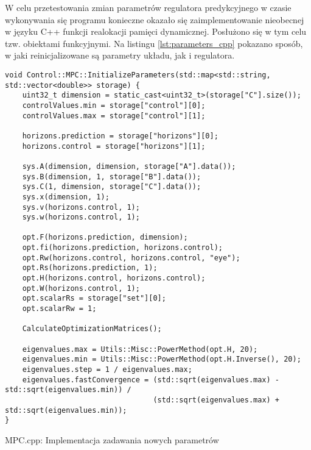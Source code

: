 W celu przetestowania zmian parametrów regulatora predykcyjnego w czasie wykonywania się programu
konieczne okazało się zaimplementowanie nieobecnej w języku C++ funkcji realokacji pamięci
dynamicznej. Posłużono się w tym celu tzw. obiektami funkcyjnymi. Na listingu
\ref{lst:parameters_cpp} pokazano sposób, w jaki reinicjalizowane są parametry układu, jak i regulatora. 
\begin{listing}[htb]
\begin{verbatim}
void Control::MPC::InitializeParameters(std::map<std::string, std::vector<double>> storage) {
    uint32_t dimension = static_cast<uint32_t>(storage["C"].size());
    controlValues.min = storage["control"][0];
    controlValues.max = storage["control"][1];

    horizons.prediction = storage["horizons"][0];
    horizons.control = storage["horizons"][1];

    sys.A(dimension, dimension, storage["A"].data());
    sys.B(dimension, 1, storage["B"].data());
    sys.C(1, dimension, storage["C"].data());
    sys.x(dimension, 1);
    sys.v(horizons.control, 1);
    sys.w(horizons.control, 1);

    opt.F(horizons.prediction, dimension);
    opt.fi(horizons.prediction, horizons.control);
    opt.Rw(horizons.control, horizons.control, "eye");
    opt.Rs(horizons.prediction, 1);
    opt.H(horizons.control, horizons.control);
    opt.W(horizons.control, 1);
    opt.scalarRs = storage["set"][0];
    opt.scalarRw = 1;

    CalculateOptimizationMatrices();

    eigenvalues.max = Utils::Misc::PowerMethod(opt.H, 20);
    eigenvalues.min = Utils::Misc::PowerMethod(opt.H.Inverse(), 20);
    eigenvalues.step = 1 / eigenvalues.max;
    eigenvalues.fastConvergence = (std::sqrt(eigenvalues.max) - std::sqrt(eigenvalues.min)) /
                                  (std::sqrt(eigenvalues.max) + std::sqrt(eigenvalues.min));
}
\end{verbatim}
\caption{MPC.cpp: Implementacja zadawania nowych parametrów}
\label{lst:parameters_cpp}
\end{listing}

